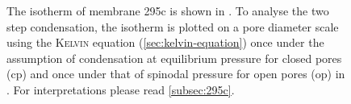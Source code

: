 \documentclass[../../../thesis.tex]{subfiles}
\begin{document}
\begin{figure}[ht]
{
        \label{fig:295c-op-cp}
      }
      \caption{The isotherm of membrane 295c is shown in \protect{}. To analyse the two step condensation, the isotherm is plotted on a pore diameter scale using the \textsc{Kelvin} equation (\cref{sec:kelvin-equation}) once under the assumption of condensation at equilibrium pressure for closed pores (cp) and once under that of spinodal pressure for open pores (op) in \protect{}. For interpretations please read \cref{subsec:295c}.}
      \label{fig:295c-analysis}
  \end{figure}
\end{document}
